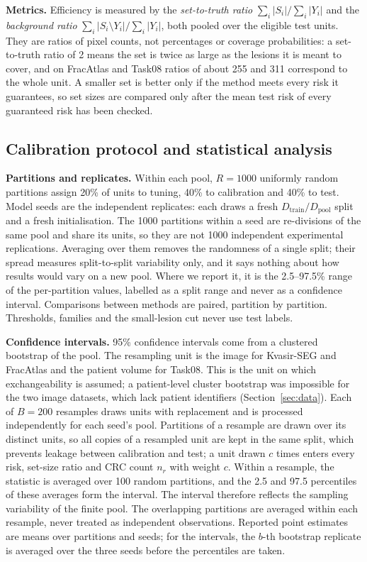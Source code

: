 \documentclass[sn-mathphys-num]{sn-jnl}%
\theoremstyle{thmstyleone}
\theoremstyle{thmstyletwo}
\theoremstyle{thmstylethree}
\newcommand{\1}{\mathbb{1}}
\begin{document}
\textbf{Metrics.} Efficiency is measured by the \emph{set-to-truth ratio} $\sum_i|S_i|/\sum_i|Y_i|$ and the \emph{background ratio} $\sum_i|S_i\setminus Y_i|/\sum_i|Y_i|$, both pooled over the eligible test units. They are ratios of pixel counts, not percentages or coverage probabilities: a set-to-truth ratio of 2 means the set is twice as large as the lesions it is meant to cover, and on FracAtlas and Task08 ratios of about 255 and 311 correspond to the whole unit. A smaller set is better only if the method meets every risk it guarantees, so set sizes are compared only after the mean test risk of every guaranteed risk has been checked.

\subsection{Calibration protocol and statistical analysis}\label{sec:stats}

\textbf{Partitions and replicates.} Within each pool, $R=1000$ uniformly random partitions assign 20\% of units to tuning, 40\% to calibration and 40\% to test. Model seeds are the independent replicates: each draws a fresh $D_{\mathrm{train}}/D_{\mathrm{pool}}$ split and a fresh initialisation. The 1000 partitions within a seed are re-divisions of the same pool and share its units, so they are not 1000 independent experimental replications. Averaging over them removes the randomness of a single split; their spread measures split-to-split variability only, and it says nothing about how results would vary on a new pool. Where we report it, it is the 2.5--97.5\% range of the per-partition values, labelled as a split range and never as a confidence interval. Comparisons between methods are paired, partition by partition. Thresholds, families and the small-lesion cut never use test labels.

\textbf{Confidence intervals.} 95\% confidence intervals come from a clustered bootstrap of the pool. The resampling unit is the image for Kvasir-SEG and FracAtlas and the patient volume for Task08. This is the unit on which exchangeability is assumed; a patient-level cluster bootstrap was impossible for the two image datasets, which lack patient identifiers (Section~\ref{sec:data}). Each of $B=200$ resamples draws units with replacement and is processed independently for each seed's pool. Partitions of a resample are drawn over its distinct units, so all copies of a resampled unit are kept in the same split, which prevents leakage between calibration and test; a unit drawn $c$ times enters every risk, set-size ratio and CRC count $n_r$ with weight $c$. Within a resample, the statistic is averaged over 100 random partitions, and the 2.5 and 97.5 percentiles of these averages form the interval. The interval therefore reflects the sampling variability of the finite pool. The overlapping partitions are averaged within each resample, never treated as independent observations. Reported point estimates are means over partitions and seeds; for the intervals, the $b$-th bootstrap replicate is averaged over the three seeds before the percentiles are taken.
\end{document}
